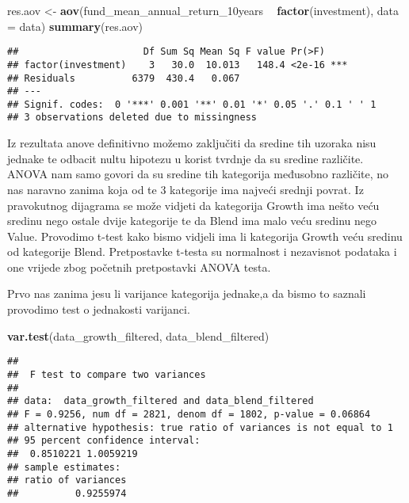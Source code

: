 \documentclass[
]{article}
\newenvironment{Shaded}{\begin{snugshade}}{\end{snugshade}}
\newcommand{\DataTypeTok}[1]{\textcolor[rgb]{0.13,0.29,0.53}{#1}}
\newcommand{\KeywordTok}[1]{\textcolor[rgb]{0.13,0.29,0.53}{\textbf{#1}}}
\newcommand{\NormalTok}[1]{#1}
\newcommand{\OperatorTok}[1]{\textcolor[rgb]{0.81,0.36,0.00}{\textbf{#1}}}
\newcommand{\StringTok}[1]{\textcolor[rgb]{0.31,0.60,0.02}{#1}}
\begin{document}
\begin{Shaded}
\begin{Highlighting}[]
\NormalTok{res.aov <-}\StringTok{ }\KeywordTok{aov}\NormalTok{(fund_mean_annual_return_10years }\OperatorTok{~}\StringTok{ }\KeywordTok{factor}\NormalTok{(investment), }\DataTypeTok{data =}\NormalTok{ data)}
\KeywordTok{summary}\NormalTok{(res.aov)}
\end{Highlighting}
\end{Shaded}

\begin{verbatim}
##                      Df Sum Sq Mean Sq F value Pr(>F)    
## factor(investment)    3   30.0  10.013   148.4 <2e-16 ***
## Residuals          6379  430.4   0.067                   
## ---
## Signif. codes:  0 '***' 0.001 '**' 0.01 '*' 0.05 '.' 0.1 ' ' 1
## 3 observations deleted due to missingness
\end{verbatim}

Iz rezultata anove definitivno možemo zaključiti da sredine tih uzoraka
nisu jednake te odbacit nultu hipotezu u korist tvrdnje da su sredine
različite. ANOVA nam samo govori da su sredine tih kategorija međusobno
različite, no nas naravno zanima koja od te 3 kategorije ima najveći
srednji povrat. Iz pravokutnog dijagrama se može vidjeti da kategorija
Growth ima nešto veću sredinu nego ostale dvije kategorije te da Blend
ima malo veću sredinu nego Value. Provodimo t-test kako bismo vidjeli
ima li kategorija Growth veću sredinu od kategorije Blend. Pretpostavke
t-testa su normalnost i nezavisnot podataka i one vrijede zbog početnih
pretpostavki ANOVA testa.

Prvo nas zanima jesu li varijance kategorija jednake,a da bismo to
saznali provodimo test o jednakosti varijanci.

\begin{Shaded}
\begin{Highlighting}[]
\KeywordTok{var.test}\NormalTok{(data_growth_filtered, data_blend_filtered)}
\end{Highlighting}
\end{Shaded}

\begin{verbatim}
## 
##  F test to compare two variances
## 
## data:  data_growth_filtered and data_blend_filtered
## F = 0.9256, num df = 2821, denom df = 1802, p-value = 0.06864
## alternative hypothesis: true ratio of variances is not equal to 1
## 95 percent confidence interval:
##  0.8510221 1.0059219
## sample estimates:
## ratio of variances 
##          0.9255974
\end{verbatim}
\end{document}
